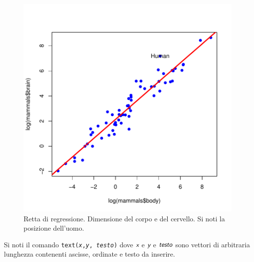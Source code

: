 \documentclass[onecolumn,12pt]{book}
\newcommand{\varia}[1]{\textsl{\textsf{#1}}}
\begin{document}
\begin{figure}[htbp]
\begin{center}
\includegraphics{RbookParte2-062}
\caption{ Retta di regressione. Dimensione del corpo e del cervello. Si noti la posizione dell'uomo.}
\label{duerette}
\end{center}
\end{figure}
Si noti il comando \texttt{text(\varia{x},\varia{y}, \varia{testo})}
dove    $\varia{x}$ e $\varia{y}$  e $\varia{testo}$ sono vettori di arbitraria lunghezza contenenti ascisse, ordinate e testo da inserire.
\end{document}
